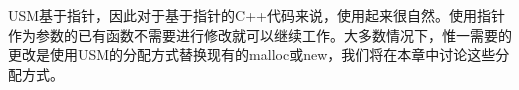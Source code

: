 USM基于指针，因此对于基于指针的C++代码来说，使用起来很自然。使用指针作为参数的已有函数不需要进行修改就可以继续工作。大多数情况下，惟一需要的更改是使用USM的分配方式替换现有的malloc或new，我们将在本章中讨论这些分配方式。\par













































